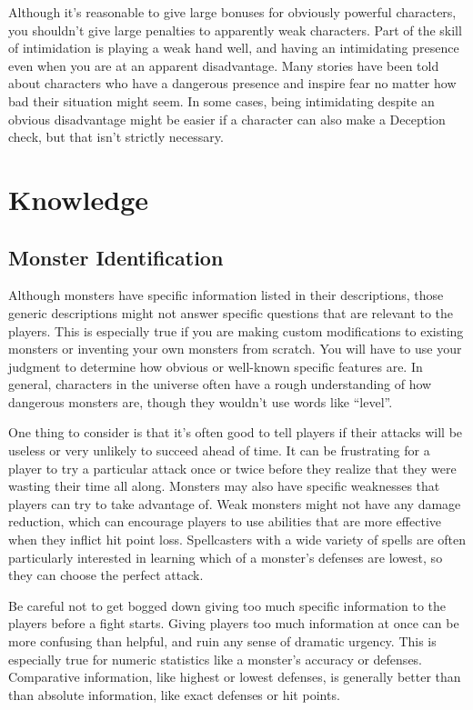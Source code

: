   Although it's reasonable to give large bonuses for obviously powerful characters, you shouldn't give large penalties to apparently weak characters.
  Part of the skill of intimidation is playing a weak hand well, and having an intimidating presence even when you are at an apparent disadvantage.
  Many stories have been told about characters who have a dangerous presence and inspire fear no matter how bad their situation might seem.
  In some cases, being intimidating despite an obvious disadvantage might be easier if a character can also make a Deception check, but that isn't strictly necessary.

\section{Knowledge}\label{Knowledge}

  \subsection{Monster Identification}
    Although monsters have specific information listed in their descriptions, those generic descriptions might not answer specific questions that are relevant to the players.
    This is especially true if you are making custom modifications to existing monsters or inventing your own monsters from scratch.
    You will have to use your judgment to determine how obvious or well-known specific features are.
    In general, characters in the universe often have a rough understanding of how dangerous monsters are, though they wouldn't use words like ``level''.

    One thing to consider is that it's often good to tell players if their attacks will be useless or very unlikely to succeed ahead of time.
    It can be frustrating for a player to try a particular attack once or twice before they realize that they were wasting their time all along.
    Monsters may also have specific weaknesses that players can try to take advantage of.
    Weak monsters might not have any damage reduction, which can encourage players to use abilities that are more effective when they inflict hit point loss.
    Spellcasters with a wide variety of spells are often particularly interested in learning which of a monster's defenses are lowest, so they can choose the perfect attack.

    Be careful not to get bogged down giving too much specific information to the players before a fight starts.
    Giving players too much information at once can be more confusing than helpful, and ruin any sense of dramatic urgency.
    This is especially true for numeric statistics like a monster's accuracy or defenses.
    Comparative information, like highest or lowest defenses, is generally better than than absolute information, like exact defenses or hit points.

